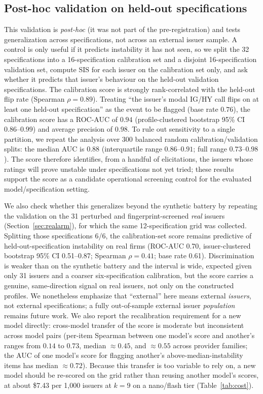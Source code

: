\documentclass[a4paper,fleqn]{cas-sc}
\begin{document}
\subsection{Post-hoc validation on held-out specifications}\label{sec:sis-val}
This validation is \emph{post-hoc} (it was not part of the pre-registration) and tests generalization
across specifications, not across an external issuer sample. A control is only useful if it predicts
instability it has not seen, so we split the 32 specifications into a 16-specification calibration set and
a disjoint 16-specification validation set, compute $\mathrm{SIS}$ for each issuer on the calibration set
only, and ask whether it predicts that issuer's behaviour on the held-out validation specifications. The
calibration score is strongly rank-correlated with the held-out flip rate (Spearman $\rho=0.89$). Treating
``the issuer's modal IG/HY call flips on at least one held-out specification'' as the event to be flagged
(base rate $0.76$), the calibration score has a ROC-AUC of $0.94$ (profile-clustered bootstrap 95\%
CI $0.86$--$0.99$) and average precision of $0.98$. To rule out sensitivity to a single partition, we
repeat the analysis over 300 balanced random calibration/validation splits: the median AUC is $0.88$
(interquartile range $0.86$--$0.91$; full range $0.73$--$0.98$). The score therefore identifies, from a
handful of elicitations, the issuers whose ratings will prove unstable under specifications not yet
tried; these results support the score as a candidate operational screening control for the evaluated model/specification setting.

We also check whether this generalizes beyond the synthetic battery by repeating the validation on the
31 perturbed and fingerprint-screened \emph{real} issuers (Section~\ref{sec:realarm}), for which the same 12-specification
grid was collected. Splitting those specifications 6/6, the calibration-set score remains predictive of
held-out-specification instability on real firms (ROC-AUC 0.70, issuer-clustered bootstrap 95\% CI
0.51--0.87; Spearman $\rho=0.41$; base rate 0.61). Discrimination is weaker than on the synthetic battery
and the interval is wide, expected given only 31 issuers and a coarser six-specification calibration, but
the score carries a genuine, same-direction signal on real issuers, not only on the constructed profiles.
We nonetheless emphasize that ``external'' here means external \emph{issuers}, not external
specifications; a fully out-of-sample external issuer \emph{population} remains future work. We also
report the recalibration requirement for a new model directly: cross-model transfer of the score is
moderate but inconsistent across model pairs (per-item Spearman between one model's score and another's
ranges from $0.14$ to $0.73$, median $\approx0.45$, and $\approx0.55$ across provider families; the AUC of
one model's score for flagging another's above-median-instability items has median $\approx0.72$). Because
this transfer is too variable to rely on, a new model should be re-scored on the grid rather than reusing
another model's scores, at about \$7.43 per 1{,}000 issuers at $k=9$ on a
nano/flash tier (Table~\ref{tab:cost}).
\end{document}
